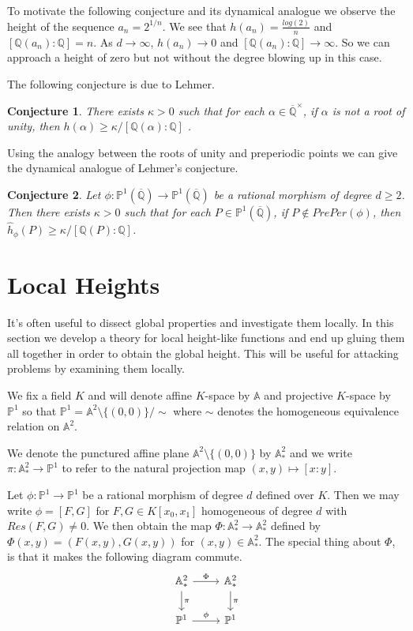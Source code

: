 \documentclass{amsart}
\newtheorem{conj}{Conjecture}
\newcommand{\AF}{\mathbb{A}}
\newcommand{\AFAF}{\mathbb{A}^2}
\newcommand{\Q}{\mathbb{Q}}
\renewcommand{\P}{\mathbb{P}}
\begin{document}
To motivate the following conjecture and its dynamical analogue we observe the height of the sequence $a_n = 2^{1/n}$. We see that $h(a_n) = \frac{log(2)}{n}$ and $[\Q(a_n):\Q] = n$. As $d \rightarrow \infty$, $h(a_n) \rightarrow 0$ and $[\Q(a_n):\Q] \rightarrow \infty$. So we can approach a height of zero but not without the degree blowing up in this case.

The following conjecture is due to Lehmer.

\begin{conj}
There exists $\kappa > 0$ such that for each $\alpha \in \overline{\Q}^{\times}$, if $\alpha$ is not a root of unity, then $h(\alpha) \geq \kappa / [\Q(\alpha):\Q]$ .
\end{conj}

Using the analogy between the roots of unity and preperiodic points we can give the  dynamical analogue of Lehmer's conjecture. 

\begin{conj}

Let $\phi: \P^1(\overline{\Q}) \rightarrow \P^1(\overline{\Q})$ be a rational morphism of degree $d \geq 2$. Then there exists $\kappa>0$ such that for each $P \in \P^1(\overline{\Q})$, if $P \notin PrePer(\phi)$, then $\hat{h}_\phi(P) \geq \kappa /[\Q(P):\Q]$.

\end{conj}

\section{Local Heights}
It's often useful to dissect global properties and investigate them locally. In this section we develop a theory for local height-like functions and end up gluing them all together in order to obtain the global height. This will be useful for attacking problems by examining them locally.  

We fix a field $K$ and will denote affine $K$-space by $\AF$ and projective $K$-space by $\P^1$ so that $\P^1 = \AFAF\setminus\{(0,0)\}/\sim$ where $\sim$ denotes the homogeneous equivalence relation on $\AFAF$.

We denote the punctured affine plane $\AFAF\setminus\{(0,0)\}$ by $\AFAF_*$ and we write $\pi: \AFAF_* \rightarrow \P^1$ to refer to the natural projection map $(x,y) \mapsto [x:y]$. 

Let $\phi: \P^1 \rightarrow \P^1$ be a rational morphism of degree $d$ defined over $K$. Then we may write $\phi = [F,G]$ for $F,G \in K[x_0,x_1]$ homogeneous of degree $d$ with $Res(F,G) \neq 0$. We then obtain the map $\Phi: \AFAF_* \rightarrow \AFAF_*$ defined by $\Phi(x,y) = (F(x,y),G(x,y))$ for $(x,y) \in \AFAF_*$. The special thing about $\Phi$, is that it makes the following diagram commute. 
\[\begin{tikzcd}
\AFAF_* \arrow[r, "\Phi"] \arrow[d, "\pi"]
& \AFAF_* \arrow[d, "\pi"] \\
\P^1 \arrow[r, "\phi"]
& \P^1
\end{tikzcd}\]
\end{document}

